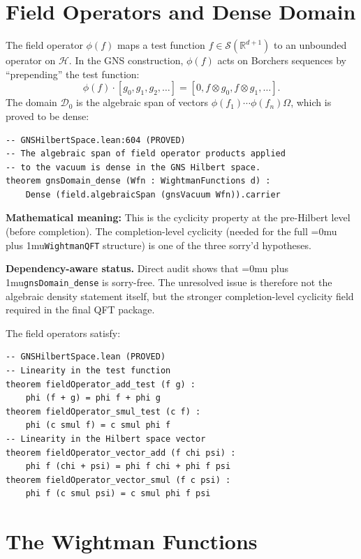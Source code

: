 \documentclass[11pt,a4paper]{article}
\newcommand{\Schwartz}{\mathscr{S}}
\newcommand{\leanname}[1]{\begingroup\Urlmuskip=0mu plus 1mu\relax\nolinkurl{#1}\endgroup}
\begin{document}
\section{Field Operators and Dense Domain}

The field operator $\phi(f)$ maps a test function $f \in \Schwartz(\mathbb{R}^{d+1})$
to an unbounded operator on $\mathscr{H}$. In the GNS construction, $\phi(f)$
acts on Borchers sequences by ``prepending'' the test function:
\[
\phi(f) \cdot [g_0, g_1, g_2, \ldots] = [0, f \otimes g_0, f \otimes g_1, \ldots].
\]
The domain $\mathscr{D}_0$ is the algebraic span of vectors
$\phi(f_1) \cdots \phi(f_n) \Omega$, which is proved to be dense:

\begin{lstlisting}
-- GNSHilbertSpace.lean:604 (PROVED)
-- The algebraic span of field operator products applied
-- to the vacuum is dense in the GNS Hilbert space.
theorem gnsDomain_dense (Wfn : WightmanFunctions d) :
    Dense (field.algebraicSpan (gnsVacuum Wfn)).carrier
\end{lstlisting}

\noindent\textbf{Mathematical meaning:} This is the cyclicity property
at the pre-Hilbert level (before completion). The completion-level
cyclicity (needed for the full \leanname{WightmanQFT} structure) is
one of the three sorry'd hypotheses.

\medskip\noindent
\textbf{Dependency-aware status.}
Direct audit shows that \leanname{gnsDomain\_dense} is sorry-free. The unresolved
issue is therefore not the algebraic density statement itself, but the stronger
completion-level cyclicity field required in the final QFT package.

The field operators satisfy:
\begin{lstlisting}
-- GNSHilbertSpace.lean (PROVED)
-- Linearity in the test function
theorem fieldOperator_add_test (f g) :
    phi (f + g) = phi f + phi g
theorem fieldOperator_smul_test (c f) :
    phi (c smul f) = c smul phi f
-- Linearity in the Hilbert space vector
theorem fieldOperator_vector_add (f chi psi) :
    phi f (chi + psi) = phi f chi + phi f psi
theorem fieldOperator_vector_smul (f c psi) :
    phi f (c smul psi) = c smul phi f psi
\end{lstlisting}

\section{The Wightman Functions}
\end{document}
